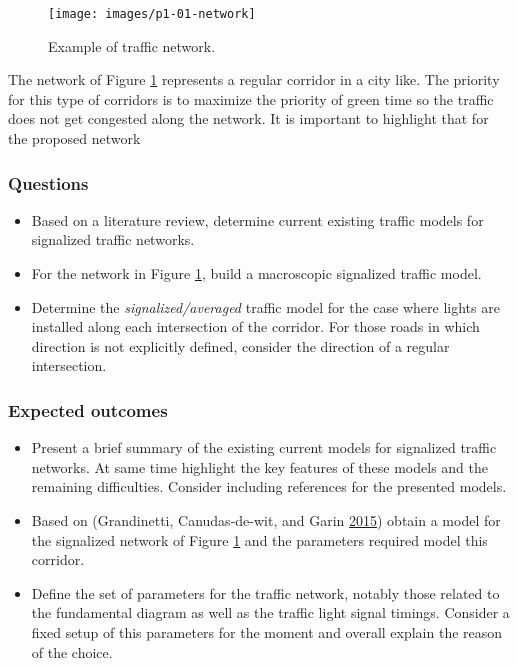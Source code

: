 \documentclass[]{book}
\providecommand{\tightlist}{%
  \setlength{\itemsep}{0pt}\setlength{\parskip}{0pt}}
\theoremstyle{definition}
\theoremstyle{definition}
\theoremstyle{definition}
\theoremstyle{remark}
\begin{document}
\begin{figure}

{\centering \texttt{[image: images/p1-01-network]} 

}

\caption{Example of traffic network.}\label{fig:city}
\end{figure}

The network of Figure \ref{fig:city} represents a regular corridor in a
city like. The priority for this type of corridors is to maximize the
priority of green time so the traffic does not get congested along the
network. It is important to highlight that for the proposed network

\hypertarget{questions}{%
\subsubsection*{Questions}\label{questions}}

\begin{itemize}
\tightlist
\item
  Based on a literature review, determine current existing traffic
  models for signalized traffic networks.
\item
  For the network in Figure \ref{fig:city}, build a macroscopic
  signalized traffic model.
\item
  Determine the \emph{signalized/averaged} traffic model for the case
  where lights are installed along each intersection of the corridor.
  For those roads in which direction is not explicitly defined, consider
  the direction of a regular intersection.
\end{itemize}

\hypertarget{expected-outcomes}{%
\subsubsection*{Expected outcomes}\label{expected-outcomes}}

\begin{itemize}
\item
  Present a brief summary of the existing current models for signalized
  traffic networks. At same time highlight the key features of these
  models and the remaining difficulties. Consider including references
  for the presented models.
\item
  Based on (Grandinetti, Canudas-de-wit, and Garin
  \protect\hyperlink{ref-Grandinetti2015}{2015}) obtain a model for the
  signalized network of Figure \ref{fig:city} and the parameters
  required model this corridor.
\item
  Define the set of parameters for the traffic network, notably those
  related to the fundamental diagram as well as the traffic light signal
  timings. Consider a fixed setup of this parameters for the moment and
  overall explain the reason of the choice.
\end{itemize}
\end{document}
